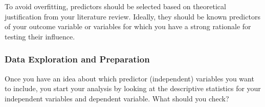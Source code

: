 \documentclass[
  letterpaper,
  DIV=11,
  numbers=noendperiod]{scrreprt}
\begin{document}
To avoid overfitting, predictors should be selected based on theoretical
justification from your literature review. Ideally, they should be known
predictors of your outcome variable or variables for which you have a
strong rationale for testing their influence.

\subsubsection*{Data Exploration and
Preparation}\label{data-exploration-and-preparation}

Once you have an idea about which predictor (independent) variables you
want to include, you start your analysis by looking at the descriptive
statistics for your independent variables and dependent variable. What
should you check?\,
\end{document}
